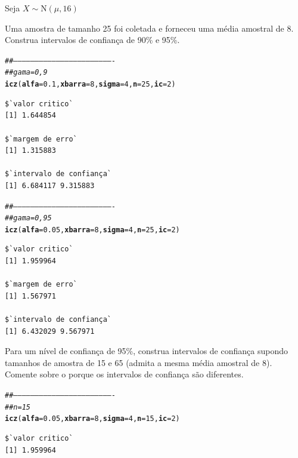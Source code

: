 \documentclass[a4paper,11pt,fleqn]{article}\usepackage[]{graphicx}\usepackage[]{color}
\makeatletter
\newcommand{\hlnum}[1]{\textcolor[rgb]{0,0,0}{#1}}%
\newcommand{\hlcom}[1]{\textcolor[rgb]{0.4,0.4,0.4}{\textit{#1}}}%
\newcommand{\hlstd}[1]{\textcolor[rgb]{0,0,0}{#1}}%
\newcommand{\hlkwc}[1]{\textcolor[rgb]{0,0,0}{\textbf{#1}}}%
\newcommand{\hlkwd}[1]{\textcolor[rgb]{0,0,0}{\textbf{#1}}}%
\newenvironment{kframe}{%
 \def\at@end@of@kframe{}%
 \ifinner\ifhmode%
  \def\at@end@of@kframe{\end{minipage}}%
  \begin{minipage}{\columnwidth}%
 \fi\fi%
 \def\FrameCommand##1{\hskip\@totalleftmargin \hskip-\fboxsep
 \colorbox{shadecolor}{##1}\hskip-\fboxsep
     \hskip-\linewidth \hskip-\@totalleftmargin \hskip\columnwidth}%
 \MakeFramed {\advance\hsize-\width
   \@totalleftmargin\z@ \linewidth\hsize
   \@setminipage}}%
 {\par\unskip\endMakeFramed%
 \at@end@of@kframe}
\newenvironment{knitrout}{}{} %
\theoremstyle{definition}
\makeatother
\begin{document}
\begin{compactenum}[6.] %
\item Seja $X \sim \text{N}(\mu, 16)$
  \begin{compactenum}
  \item Uma amostra de tamanho 25 foi coletada e forneceu uma média
    amostral de 8. Construa intervalos de confiança de 90\% e 95\%.
\begin{knitrout}\small
{}\color{fgcolor}\begin{kframe}
\begin{alltt}
\hlcom{##----------------------------------------------------------------------}
\hlcom{## gama = 0,9}
\hlkwd{icz}\hlstd{(}\hlkwc{alfa} \hlstd{=} \hlnum{0.1}\hlstd{,} \hlkwc{xbarra} \hlstd{=} \hlnum{8}\hlstd{,} \hlkwc{sigma} \hlstd{=} \hlnum{4}\hlstd{,} \hlkwc{n} \hlstd{=} \hlnum{25}\hlstd{,} \hlkwc{ic} \hlstd{=} \hlnum{2}\hlstd{)}
\end{alltt}
\begin{verbatim}
$`valor critico`
[1] 1.644854

$`margem de erro`
[1] 1.315883

$`intervalo de confiança`
[1] 6.684117 9.315883
\end{verbatim}
\begin{alltt}
\hlcom{##----------------------------------------------------------------------}
\hlcom{## gama = 0,95}
\hlkwd{icz}\hlstd{(}\hlkwc{alfa} \hlstd{=} \hlnum{0.05}\hlstd{,} \hlkwc{xbarra} \hlstd{=} \hlnum{8}\hlstd{,} \hlkwc{sigma} \hlstd{=} \hlnum{4}\hlstd{,} \hlkwc{n} \hlstd{=} \hlnum{25}\hlstd{,} \hlkwc{ic} \hlstd{=} \hlnum{2}\hlstd{)}
\end{alltt}
\begin{verbatim}
$`valor critico`
[1] 1.959964

$`margem de erro`
[1] 1.567971

$`intervalo de confiança`
[1] 6.432029 9.567971
\end{verbatim}
\end{kframe}
\end{knitrout}
  \item Para um nível de confiança de 95\%, construa intervalos de
    confiança supondo tamanhos de amostra de 15 e 65 (admita a mesma
    média amostral de 8). Comente sobre o porque os intervalos de
    confiança são diferentes.
\begin{knitrout}\small
{}\color{fgcolor}\begin{kframe}
\begin{alltt}
\hlcom{##----------------------------------------------------------------------}
\hlcom{## n = 15}
\hlkwd{icz}\hlstd{(}\hlkwc{alfa} \hlstd{=} \hlnum{0.05}\hlstd{,} \hlkwc{xbarra} \hlstd{=} \hlnum{8}\hlstd{,} \hlkwc{sigma} \hlstd{=} \hlnum{4}\hlstd{,} \hlkwc{n} \hlstd{=} \hlnum{15}\hlstd{,} \hlkwc{ic} \hlstd{=} \hlnum{2}\hlstd{)}
\end{alltt}
\begin{verbatim}
$`valor critico`
[1] 1.959964


\end{verbatim}
\end{kframe}
\end{knitrout}
\end{compactenum}
\end{compactenum}
\end{document}
